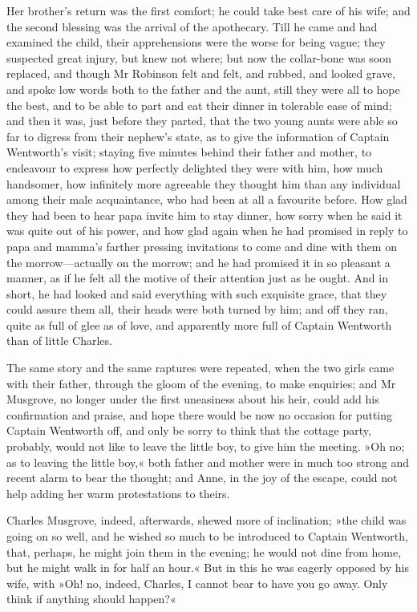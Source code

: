 Her brother's return was the first comfort; he could take best care of his wife; and the second blessing was the arrival of the apothecary. Till he came and had examined the child, their apprehensions were the worse for being vague; they suspected great injury, but knew not where; but now the collar-bone was soon replaced, and though Mr Robinson felt and felt, and rubbed, and looked grave, and spoke low words both to the father and the aunt, still they were all to hope the best, and to be able to part and eat their dinner in tolerable ease of mind; and then it was, just before they parted, that the two young aunts were able so far to digress from their nephew's state, as to give the information of Captain Wentworth's visit; staying five minutes behind their father and mother, to endeavour to express how perfectly delighted they were with him, how much handsomer, how infinitely more agreeable they thought him than any individual among their male acquaintance, who had been at all a favourite before. How glad they had been to hear papa invite him to stay dinner, how sorry when he said it was quite out of his power, and how glad again when he had promised in reply to papa and mamma's farther pressing invitations to come and dine with them on the morrow—actually on the morrow; and he had promised it in so pleasant a manner, as if he felt all the motive of their attention just as he ought. And in short, he had looked and said everything with such exquisite grace, that they could assure them all, their heads were both turned by him; and off they ran, quite as full of glee as of love, and apparently more full of Captain Wentworth than of little Charles.

The same story and the same raptures were repeated, when the two girls came with their father, through the gloom of the evening, to make enquiries; and Mr Musgrove, no longer under the first uneasiness about his heir, could add his confirmation and praise, and hope there would be now no occasion for putting Captain Wentworth off, and only be sorry to think that the cottage party, probably, would not like to leave the little boy, to give him the meeting. »Oh no; as to leaving the little boy,« both father and mother were in much too strong and recent alarm to bear the thought; and Anne, in the joy of the escape, could not help adding her warm protestations to theirs.

Charles Musgrove, indeed, afterwards, shewed more of inclination; »the child was going on so well, and he wished so much to be introduced to Captain Wentworth, that, perhaps, he might join them in the evening; he would not dine from home, but he might walk in for half an hour.« But in this he was eagerly opposed by his wife, with »Oh! no, indeed, Charles, I cannot bear to have you go away. Only think if anything should happen?«

